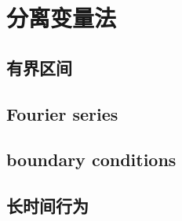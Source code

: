 \section{分离变量法}
\label{b2:sec:1201}


\subsection{有界区间}
\label{b2:subsec:120101}

\subsection{Fourier series}
\label{b2:subsec:120102}

\subsection{boundary conditions}
\label{b2:subsec:120103}

\subsection{长时间行为}
\label{b2:subsec:120104}


